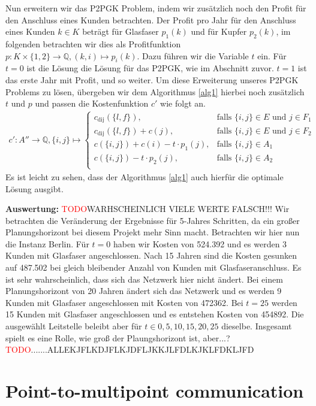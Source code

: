 \documentclass[11pt,a4paper]{article}
\newcommand{\Q}{\mathbb{Q}}
\newcommand{\TODO}{\textcolor{red}{TODO}}
\theoremstyle{my_th_style1}
\begin{document}
Nun erweitern wir das P2PGK Problem, indem wir zusätzlich noch den Profit für den Anschluss eines Kunden  betrachten.
Der Profit pro Jahr für den Anschluss eines Kunden $k \in K$ beträgt für Glasfaser $p_1(k)$ und für Kupfer $p_2(k)$, im folgenden betrachten wir dies als Profitfunktion $p:K \times \{1,2\} \rightarrow \Q,(k,i) \mapsto p_i(k)$. Dazu führen wir die Variable $t$ ein. Für $t=0$ ist die Lösung die Lösung für das P2PGK, wie im Abschnitt zuvor. $t=1$ ist das erste Jahr mit Profit, und so weiter. Um diese Erweiterung unseres P2PGK Problems zu lösen, übergeben wir dem Algorithmus  \ref{alg1} hierbei noch zusätzlich $t$ und $p$ und passen die Kostenfunktion $c'$ wie folgt an.
\begin{align*}
c': A'' \rightarrow \Q, \{ i,j \} \mapsto \left\{\begin{array}{cl} 
c_{\text{dij}}(\{l,f\}), & \text{falls } \{i,j\} \in E \text{ und } j \in F_1\\ 
c_{\text{dij}}(\{l,f\})+c(j), & \text{falls } \{i,j\} \in E \text{ und } j \in F_2\\ 
c(\{i,j\}) + c(i) - t \cdot p_1(j), & \text{falls } \{i,j\} \in A_1\\ 
c(\{i,j\}) - t \cdot p_2(j), & \text{falls } \{i,j\} \in A_2\\ 
\end{array}
\right.
\end{align*}
Es ist leicht zu sehen, dass der Algorithmus \ref{alg1} auch hierfür die optimale Lösung ausgibt. 

\textbf{Auswertung:}
\TODO WARHSCHEINLICH VIELE WERTE FALSCH!!!
Wir betrachten die Veränderung der Ergebnisse für 5-Jahres Schritten, da ein großer Planungshorizont bei diesem Projekt mehr Sinn macht.
Betrachten wir hier nun die Instanz Berlin. Für $t=0$ haben wir Kosten von 524.392 und es werden 3 Kunden mit Glasfaser angeschlossen. Nach 15 Jahren sind die Kosten gesunken auf 487.502 bei gleich bleibender Anzahl von Kunden mit Glasfaseranschluss. Es ist sehr wahrscheinlich, dass sich das Netzwerk hier nicht ändert. Bei einem Planungshorizont von 20 Jahren ändert sich das Netzwerk und es werden 9 Kunden mit Glasfaser angeschlossen mit Kosten von 472362. Bei $t=25$ werden 15 Kunden mit Glasfaser angeschlossen und es entstehen Kosten von 454892. Die ausgewählt Leitstelle beleibt aber für $t \in {0,5,10,15,20,25}$ dieselbe.
Insgesamt spielt es eine Rolle, wie groß der Plaungshorizont ist, aber...?\TODO.......ALLEKJFLKDJFLKJDFLJKKJLFDLKJKLFDKLJFD

\section{Point-to-multipoint communication}
\end{document}

